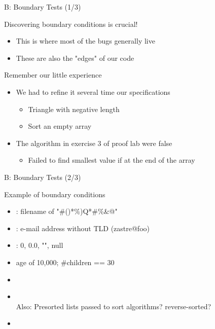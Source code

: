 \begin{frame}{B: Boundary Tests (1/3)} 

  \begin{block}{Discovering boundary conditions is crucial!}
    \begin{itemize}
    \item This is where most of the bugs generally live
    \item These are also the "edges" of our code 
    \end{itemize}
  \end{block}

  \begin{block}{Remember our little experience}
    \begin{itemize}
    \item We had to refine it several time our specifications
      \begin{itemize}
      \item Triangle with negative length
      \item Sort an empty array
      \end{itemize}
    \item The algorithm in exercise 3 of proof lab were false
      \begin{itemize}
      \item Failed to find smallest value if at the end of the array
      \end{itemize}
    \end{itemize}
  \end{block}
\end{frame}
\begin{frame}{B: Boundary Tests (2/3)}
  \begin{block}{Example of boundary conditions}
    \begin{itemize}
    \item {}: filename of "\#()*\%)Q*\#\%\&@"
    \item {}: e-mail address without TLD (zastre@foo)
    \item {}: 0, 0.0, "", null
    \item {} age of 10,000; \#children == 30
    \item {}
    \item {}\\
      {\small Also: Presorted lists passed to sort algorithms? reverse-sorted?}
    \item {}
    \end{itemize}
  \end{block}
\end{frame}

